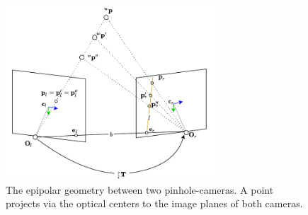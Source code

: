 \documentclass[headsepline, hidelinks, footsepline, footinclude=false, oneside, fontsize=11pt, paper=a4, listof=totoc, bibliography=totoc]{scrbook}
\begin{document}
\begin{figure}[htbp]
\centering
\includegraphics[width=0.7\textwidth]{figures/epipolar-geom.pdf}
\caption{\label{fig:epipolar-geom}The epipolar geometry between two pinhole-cameras. A point projects via the optical centers to the image planes of both cameras.}
\end{figure}
\end{document}
